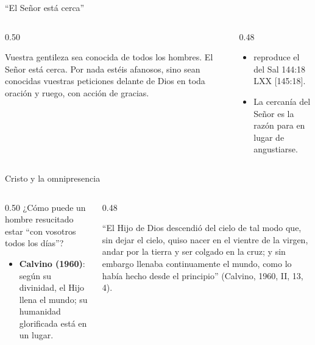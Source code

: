 \begin{frame}{``El Señor está cerca''}
\begin{columns}[c,onlytextwidth]
\begin{column}{0.50\textwidth}
\begin{cita}Vuestra gentileza sea conocida de todos los hombres. El Señor está cerca. Por nada estéis afanosos, sino sean conocidas vuestras peticiones delante de Dios en toda oración y ruego, con acción de gracias.\end{cita}
\end{column}
\begin{column}{0.48\textwidth}\small
\begin{itemize}
\item {} reproduce el  del Sal 144:18 LXX [145:18].
\item La cercanía del Señor es la razón para  en lugar de angustiarse.
\end{itemize}
\end{column}
\end{columns}
\end{frame}

\begin{frame}{Cristo y la omnipresencia}
\begin{columns}[t,onlytextwidth]
\begin{column}{0.50\textwidth}\small
¿Cómo puede un hombre resucitado estar ``con vosotros todos los días''?
\begin{itemize}
\item \textbf{Calvino (1960)}: según su divinidad, el Hijo llena el mundo; su humanidad glorificada está en un lugar.
\end{itemize}
\end{column}
\begin{column}{0.48\textwidth}
\begin{tcolorbox}[colback=papiro,colframe=dorado,boxrule=1.2pt,arc=3pt]
\scriptsize ``El Hijo de Dios descendió del cielo de tal modo que, sin dejar el cielo, quiso nacer en el vientre de la virgen, andar por la tierra y ser colgado en la cruz; y sin embargo llenaba continuamente el mundo, como lo había hecho desde el principio'' (Calvino, 1960, II, 13, 4).
\end{tcolorbox}
\end{column}
\end{columns}
\end{frame}

